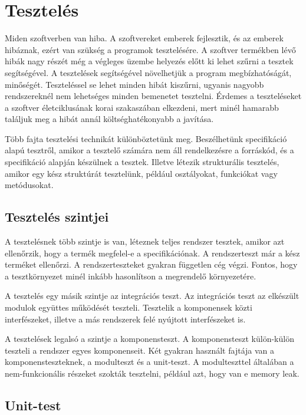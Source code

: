\chapter{Tesztelés}

Miden szoftverben van hiba. A szoftvereket emberek fejlesztik, és az emberek hibáznak, ezért van szükség a programok tesztelésére. A szoftver termékben lévő hibák nagy részét még a végleges üzembe helyezés előtt ki lehet szűrni a tesztek segítségével. A tesztelések segítségével növelhetjük a program megbízhatóságát, minőségét. Teszteléssel se lehet minden hibát kiszűrni, ugyanis nagyobb rendszereknél nem lehetséges minden bemenetet tesztelni. Érdemes a teszteléseket a szoftver életciklusának korai szakaszában elkezdeni, mert minél hamarabb találjuk meg a hibát annál költséghatékonyabb a javítása.

Több fajta tesztelési technikát különböztetünk meg. Beszélhetünk specifikáció alapú tesztről, amikor a tesztelő számára nem áll rendelkezésre a forráskód, és a specifikáció alapján készülnek a tesztek. Illetve létezik strukturális tesztelés, amikor egy kész struktúrát tesztelünk, például osztályokat, funkciókat vagy metódusokat.

\section{Tesztelés szintjei}

A tesztelésnek több szintje is van, léteznek teljes rendszer tesztek,	 amikor azt ellenőrzik, hogy a termék megfelel-e a specifikációnak. A rendszerteszt már a kész terméket ellenőrzi. A rendszerteszteket gyakran független cég végzi. Fontos, hogy a tesztkörnyezet minél inkább hasonlítson a megrendelő környezetére.

A tesztelés egy másik szintje az integrációs teszt. Az integrációs teszt az elkészült modulok együttes működését teszteli. Tesztelik a komponensek közti interfészeket, illetve a más rendszerek felé nyújtott interfészeket is.

A tesztelések legalsó a szintje a komponensteszt. A komponensteszt külön-külön teszteli a rendszer egyes komponenseit. Két gyakran használt fajtája van a komponensteszteknek, a modulteszt és a unit-teszt. A modulteszttel általában a nem-funkcionális részeket szokták tesztelni, például azt, hogy van e memory leak.

\section{Unit-test}

